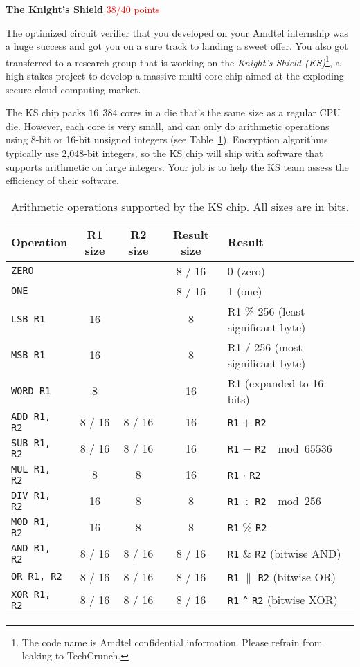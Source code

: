 \documentclass[12pt,twoside]{article}
\begin{document}
\begin{problems}

\problem \textbf{The Knight's Shield} \textcolor{red}{38/40 points}

The optimized circuit verifier that you developed on your Amdtel internship was
a huge success and got you on a sure track to landing a sweet offer. You also
got transferred to a research group that is working on the \textit{Knight's
Shield (KS)}\footnote{The code name is Amdtel confidential information. Please
refrain from leaking to TechCrunch.}, a high-stakes project to develop a massive
multi-core chip aimed at the exploding secure cloud computing market.

The KS chip packs $16{,}384$ cores in a die that's the same size as a regular
CPU die. However, each core is very small, and can only do arithmetic operations
using 8-bit or 16-bit unsigned integers (see Table~\ref{table:ks-opcodes}).
Encryption algorithms typically use 2,048-bit integers, so the KS chip will ship
with software that supports arithmetic on large integers. Your job is to help
the KS team assess the efficiency of their software.

\begin{table}[htbp]
\centering
\begin{tabular}{|l|c|c|c|l|}
\hline
Operation & R1 size & R2 size & Result size & Result \\
\hline
\texttt{ZERO} & & & 8 / 16 & 0 (zero) \\ 
\hline
\texttt{ONE} & & & 8 / 16 & 1 (one) \\ 
\hline
\texttt{LSB R1} & 16 & & 8 & R1 \% 256 (least significant byte) \\ 
\hline
\texttt{MSB R1} & 16 & & 8 & R1 / 256 (most significant byte) \\ 
\hline
\texttt{WORD R1} & 8 & & 16 & R1 (expanded to 16-bits) \\ 
\hline
\texttt{ADD R1, R2} & 8 / 16 & 8 / 16 & 16 & \texttt{R1} $+$ \texttt{R2} \\ 
\hline
\texttt{SUB R1, R2} & 8 / 16 & 8 / 16 & 16 & \texttt{R1} $-$ \texttt{R2} $\mod
65536$\\
\hline
\texttt{MUL R1, R2} & 8 & 8 & 16 & \texttt{R1} $\cdot$ \texttt{R2} \\ 
\hline
\texttt{DIV R1, R2} & 16 & 8 & 8 & \texttt{R1} $\div$ \texttt{R2} $\mod 256$\\ 
\hline
\texttt{MOD R1, R2} & 16 & 8 & 8 & \texttt{R1} \% \texttt{R2} \\ 
\hline
\texttt{AND R1, R2} & 8 / 16 & 8 / 16 & 8 / 16 & \texttt{R1} \& \texttt{R2}
(bitwise AND) \\
\hline
\texttt{OR R1, R2} & 8 / 16 & 8 / 16 & 8 / 16 & \texttt{R1} $\|$ \texttt{R2}
(bitwise OR) \\
\hline
\texttt{XOR R1, R2} & 8 / 16 & 8 / 16 & 8 / 16 & \texttt{R1} \verb|^|
\texttt{R2} (bitwise XOR) \\
\hline
\end{tabular}
\caption{Arithmetic operations supported by the KS chip. All sizes are in bits.}
\label{table:ks-opcodes}
\end{table}


\end{problems}
\end{document}
